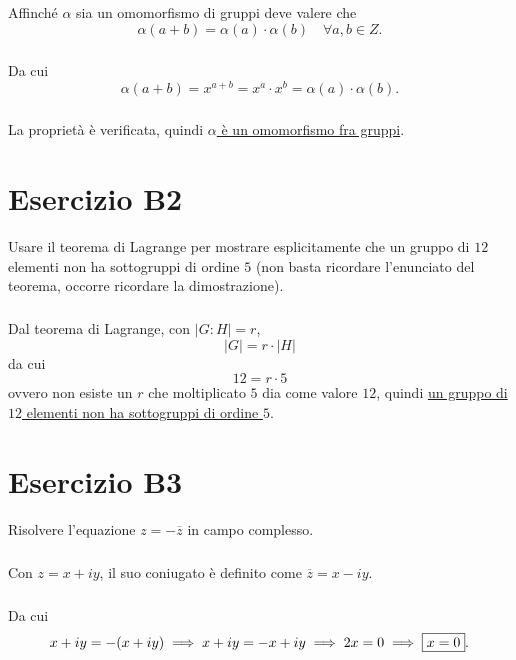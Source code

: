 \documentclass[a4paper]{report}
\newenvironment{problem}
        {
                \begin{mdframed}[topline=false,rightline=false,bottomline=false]
                        \slshape
        }
        {
                \end{mdframed}
        }
\begin{document}
        \paragraph{}
        Affinch\'{e} $\alpha$ sia un omomorfismo di gruppi deve valere che
        \[
                \alpha(a + b) = \alpha(a) \cdot \alpha(b) \quad \forall a,b \in Z.
        \]

        \paragraph{}
        Da cui
        \[
                        \alpha(a + b) = x^{a + b} = x^a \cdot x^b = \alpha(a) \cdot \alpha(b).
        \]

        \paragraph{}
        La propriet\`{a} \`{e} verificata, quindi \ul{$\alpha$ \`{e} un omomorfismo fra gruppi}.


        \chapter*{Esercizio B2}
        \begin{problem}
                Usare il teorema di Lagrange per mostrare esplicitamente che un gruppo di $12$ elementi
                non ha sottogruppi di ordine $5$ (non basta ricordare l'enunciato del teorema, occorre
                ricordare la dimostrazione).
        \end{problem}

        \paragraph{}
        Dal teorema di Lagrange, con $ |G:H| = r $,
        \[
                |G| =  r \cdot |H|
        \]
        da cui
        \[
                12 = r \cdot 5
        \]
        ovvero non esiste un $r$ che moltiplicato $5$ dia come valore $12$, quindi \ul{un gruppo di $12$ elementi
        non ha sottogruppi di ordine $5$}.


        \chapter*{Esercizio B3}
        \begin{problem}
                Risolvere l'equazione $ z = - \overline{z} $ in campo complesso.
        \end{problem}

        \paragraph{}
        Con $ z = x + iy $, il suo coniugato \`{e} definito come $ \overline{z} = x - iy $.

        \paragraph{}
        Da cui
        \[
                x + iy = - (x + iy) \implies x + iy = -x + iy \implies 2x = 0 \implies \framebox{$x = 0$}.
        \]
\end{document}
